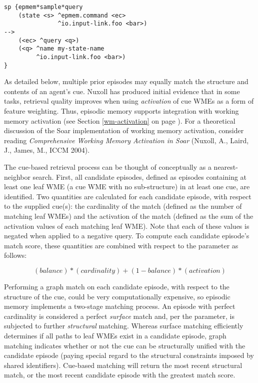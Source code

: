 \begin{verbatim}
sp {epmem*sample*query
    (state <s> ^epmem.command <ec>
               ^io.input-link.foo <bar>)
-->
    (<ec> ^query <q>)
    (<q> ^name my-state-name
         ^io.input-link.foo <bar>)
}
\end{verbatim}

As detailed below, multiple prior episodes may equally match the structure and contents of an agent's cue. 
Nuxoll has produced initial evidence that in some tasks, retrieval quality improves when using \emph{activation} of cue WMEs as a form of feature weighting.  
Thus, episodic memory supports integration with working memory activation (see Section \ref{wm-activation} on page \pageref{wm-activation}).  
For a theoretical discussion of the Soar implementation of working memory activation, consider reading \emph{Comprehensive Working Memory Activation in Soar} (Nuxoll, A., Laird, J., James, M., ICCM 2004).

The cue-based retrieval process can be thought of conceptually as a nearest-neighbor search. 
First, all candidate episodes, defined as episodes containing at least one leaf WME (a cue WME with no sub-structure) in at least one cue, are identified.  
Two quantities are calculated for each candidate episode, with respect to the supplied cue(s): the cardinality of the match (defined as the number of matching leaf WMEs) and the activation of the match (defined as the sum of the activation values of each matching leaf WME).  
Note that each of these values is negated when applied to a negative query.  
To compute each candidate episode's match score, these quantities are combined with respect to the  parameter as follows:

$$(balance)*(cardinality) + (1-balance)*(activation)$$

Performing a graph match on each candidate episode, with respect to the structure of the cue, could be very computationally expensive, so episodic memory implements a two-stage matching process.
An episode with perfect cardinality is considered a perfect \emph{surface} match and, per the  parameter, is subjected to further \emph{structural} matching.  
Whereas surface matching efficiently determines if all paths to leaf WMEs exist in a candidate episode, graph matching indicates whether or not the cue can be structurally unified with the candidate episode (paying special regard to the structural constraints imposed by shared identifiers).  
Cue-based matching will return the most recent structural match, or the most recent candidate episode with the greatest match score.

